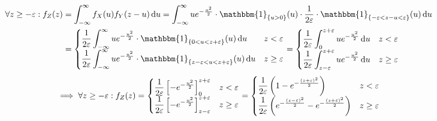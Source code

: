 \[\begin{aligned}
		\forall z \geq -\varepsilon : f_Z(z) & = \int_{-\infty}^{\infty} f_X(u) f_Y(z-u)\odif{u} = \int_{-\infty}^{\infty} ue^{-\frac{u^2}{2}} \cdot \mathbbm{1}_{\{u>0\}}(u)\cdot \frac{1}{2\varepsilon} \cdot \mathbbm{1}_{\{-\varepsilon<z-u<\varepsilon\}} (u) \odif{u} \\
		                                     & = \begin{cases}
			                                         \ds \frac{1}{2\varepsilon} \int_{-\infty}^{\infty} ue^{-\frac{u^2}{2}} \cdot \mathbbm{1}_{\{0 < u < z+\varepsilon\}}(u)\odif{u}              & z < \varepsilon    \\
			                                         \ds \frac{1}{2\varepsilon} \int_{-\infty}^{\infty} ue^{-\frac{u^2}{2}} \cdot \mathbbm{1}_{\{z-\varepsilon < u < z+\varepsilon\}}(u) \odif{u} & z \geq \varepsilon
		                                         \end{cases} = \begin{cases}
			                                                       \ds \frac{1}{2\varepsilon} \int_{0}^{z+\varepsilon} ue^{-\frac{u^2}{2}}\odif{u}              & z < \varepsilon    \\
			                                                       \ds \frac{1}{2\varepsilon} \int_{z-\varepsilon}^{z+\varepsilon} ue^{-\frac{u^2}{2}} \odif{u} & z \geq \varepsilon
		                                                       \end{cases}
	\end{aligned}\]
\[\implies \forall z \geq -\varepsilon : f_Z(z) = \begin{cases}
		\displaystyle \frac{1}{2\varepsilon} \left[-e^{-\frac{u^2}{2}}\right]_{0}^{z+\varepsilon}             & z < \varepsilon    \\
		\displaystyle \frac{1}{2\varepsilon} \left[-e^{-\frac{u^2}{2}}\right]_{z-\varepsilon}^{z+\varepsilon} & z \geq \varepsilon
	\end{cases} = \begin{cases}
		\displaystyle \frac{1}{2\varepsilon} \left(1-e^{-\frac{(z+\varepsilon)^2}{2}}\right)                                & z < \varepsilon    \\
		\displaystyle \frac{1}{2\varepsilon} \left(e^{-\frac{(z-\varepsilon)^2}{2}}-e^{-\frac{(z+\varepsilon)^2}{2}}\right) & z \geq \varepsilon
	\end{cases}\]
\begin{center}
\end{center}

